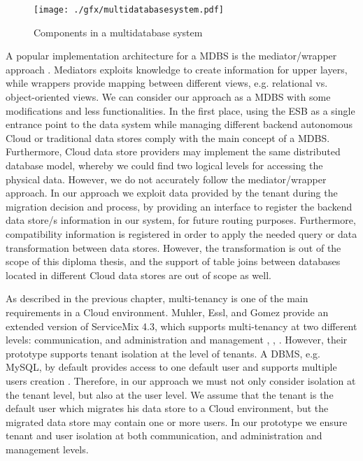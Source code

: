 \begin{figure}[htb]
	\centering
		\texttt{[image: ./gfx/multidatabasesystem.pdf]}
	\caption[Multidatabase System Components]{Components in a multidatabase system \cite{ddbsozsu}}
	\label{fig:multidatabasesystem}
\end{figure}

A popular implementation architecture for a \ac{MDBS} is the mediator/wrapper approach \cite{ddbsozsu}. Mediators exploits knowledge to create information for upper layers, while wrappers provide mapping between different views, e.g. relational vs. object-oriented views. We can consider our approach as a \ac{MDBS} with some modifications and less functionalities. In the first place, using the \ac{ESB} as a single entrance point to the data system while managing different backend autonomous Cloud or traditional data stores comply with the main concept of a \ac{MDBS}. Furthermore, Cloud data store providers may implement the same distributed database model, whereby we could find two logical levels for accessing the physical data. However, we do not accurately follow the mediator/wrapper approach. In our approach we exploit data provided by the tenant during the migration decision and process, by providing an interface to register the backend data store/s information in our system, for future routing purposes. Furthermore, compatibility information is registered in order to apply the needed query or data transformation between data stores. However, the transformation is out of the scope of this diploma thesis, and the support of table joins between databases located in different Cloud data stores are out of scope as well.

As described in the previous chapter, multi-tenancy is one of the main requirements in a Cloud environment. Muhler, Essl, and Gomez provide an extended version of ServiceMix 4.3, which supports multi-tenancy at two different levels: communication, and administration and management \cite{Muhler2012}, \cite{Essl2011}, \cite{gomez2012}. However, their prototype supports tenant isolation at the level of tenants. A \ac{DBMS}, e.g. MySQL, by default provides access to one default user and supports multiple users creation \cite{mysqlmanual}. Therefore, in our approach we must not only consider isolation at the tenant level, but also at the user level. We assume that the tenant is the default user which migrates his data store to a Cloud environment, but the migrated data store may contain one or more users. In our prototype we ensure tenant and user isolation at both communication, and administration and management levels.

